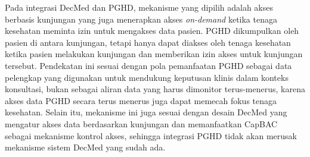 Pada integrasi DecMed dan PGHD, mekanisme yang dipilih adalah akses berbasis kunjungan yang juga menerapkan akses \textit{on-demand} ketika tenaga kesehatan meminta izin untuk mengakses data pasien.
PGHD dikumpulkan oleh pasien di antara kunjungan, tetapi hanya dapat diakses oleh tenaga kesehatan ketika pasien melakukan kunjungan dan memberikan izin akses untuk kunjungan tersebut. 
Pendekatan ini sesuai dengan pola pemanfaatan PGHD sebagai data pelengkap yang digunakan untuk mendukung keputusan klinis dalam konteks konsultasi, bukan sebagai aliran data yang harus dimonitor terus-menerus, karena akses data PGHD secara terus menerus juga dapat memecah fokus tenaga kesehatan.
Selain itu, mekanisme ini juga sesuai dengan desain DecMed yang mengatur akses data berdasarkan kunjungan dan memanfaatkan CapBAC sebagai mekanisme kontrol akses, sehingga integrasi PGHD tidak akan merusak mekanisme sistem DecMed yang sudah ada.